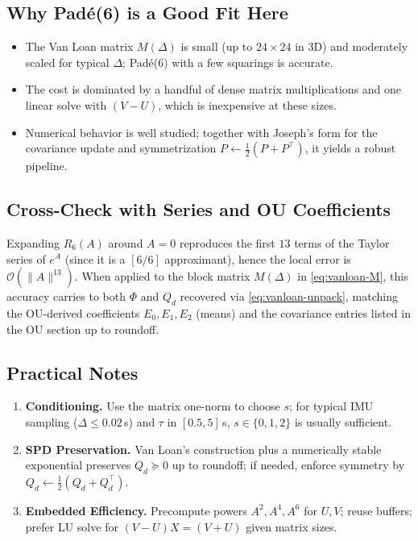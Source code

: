\documentclass[10pt]{extarticle}
\begin{document}
\subsection{Why Pad\'e(6) is a Good Fit Here}
\begin{itemize}
\item The Van Loan matrix $M(\Delta)$ is small (up to $24\times 24$ in 3D) and moderately scaled for typical $\Delta$; Pad\'e(6) with a few squarings is accurate.
\item The cost is dominated by a handful of dense matrix multiplications and one linear solve with $(V-U)$, which is inexpensive at these sizes.
\item Numerical behavior is well studied; together with Joseph’s form for the covariance update and symmetrization $P\leftarrow \tfrac12(P+P^\top)$, it yields a robust pipeline.
\end{itemize}

\subsection{Cross-Check with Series and OU Coefficients}
Expanding $R_6(A)$ around $A=0$ reproduces the first $13$ terms of the Taylor series of $e^A$ (since it is a $[6/6]$ approximant),
hence the local error is $\mathcal{O}(\|A\|^{13})$. When applied to the block matrix $M(\Delta)$ in \eqref{eq:vanloan-M}, this accuracy carries to both
$\Phi$ and $Q_d$ recovered via \eqref{eq:vanloan-unpack}, matching the OU-derived coefficients $E_0,E_1,E_2$ (means) and the covariance entries
listed in the OU section up to roundoff.

\subsection{Practical Notes}
\begin{enumerate}
\item \textbf{Conditioning.} Use the matrix one-norm to choose $s$; for typical IMU sampling ($\Delta\le 0.02$\,s) and $\tau$ in $[0.5,5]$\,s,
$s\in\{0,1,2\}$ is usually sufficient.
\item \textbf{SPD Preservation.} Van Loan’s construction plus a numerically stable exponential preserves $Q_d\succeq 0$ up to roundoff; if needed, enforce symmetry by $Q_d\leftarrow \tfrac12(Q_d+Q_d^\top)$.
\item \textbf{Embedded Efficiency.} Precompute powers $A^2,A^4,A^6$ for $U,V$; reuse buffers; prefer LU solve for $(V-U)X=(V+U)$ given matrix sizes.
\end{enumerate}
\end{document}
